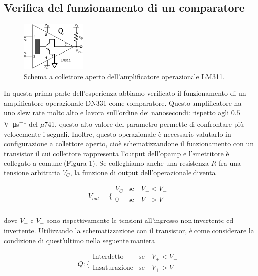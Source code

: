 \subsection{Verifica del funzionamento di un comparatore}

\begin{figure}
  \begin{center}
    \includegraphics[width=0.280\textwidth]{../E04/latex/c_LM311.pdf}
  \end{center}
  \caption{Schema a collettore aperto dell'amplificatore operazionale LM311.}
  \label{cir4:open_collector}
\end{figure}

In questa prima parte dell'esperienza abbiamo verificato il funzionamento di un amplificatore operazionale DN331 come comparatore. Questo amplificatore ha uno slew rate molto alto e lavora sull'ordine dei nanosecondi: rispetto agli $0.5$\si{\volt\per\micro\second} del $\mu$741, questo alto valore del parametro permette di confrontare più velocemente i segnali. Inoltre, questo operazionale è necessario valutarlo in configurazione a collettore aperto, cioè schematizzandone il funzionamento con un transistor il cui collettore rappresenta l'output dell'opamp e l'emettitore è collegato a comune (Figura \ref{cir4:open_collector}). Se colleghiamo anche una resistenza $R$ fra una tensione arbitraria $V_C$, la funzione di output dell'operazionale diventa

\begin{equation}
V_{out} = \bigg \{
\begin{array}{rl}
V_C & \mathrm{se} \quad V_+ < V_- \\
0 & \mathrm{se} \quad V_+ > V_- \\
\end{array}
\label{eq4:comparatore}
\end{equation}

dove $V_+$ e $V_-$ sono rispettivamente le tensioni all'ingresso non invertente ed invertente. Utilizzando la schematizzazione con il transistor, è come considerare la condizione di quest'ultimo nella seguente maniera

\begin{equation}
Q : \bigg \{
\begin{array}{rl}
\mathrm{Interdetto} & \mathrm{se} \quad V_+ < V_- \\
\mathrm{In saturazione} & \mathrm{se} \quad V_+ > V_- \\
\end{array}
\label{eq4:comparatore_Q}
\end{equation}

